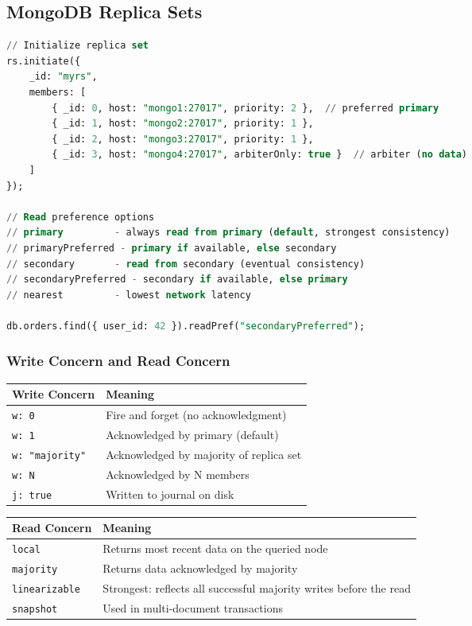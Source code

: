 \documentclass[12pt,a4paper]{article}
\begin{document}
\subsection{MongoDB Replica Sets}

\begin{lstlisting}[language=SQL, caption={MongoDB replica set}]
// Initialize replica set
rs.initiate({
    _id: "myrs",
    members: [
        { _id: 0, host: "mongo1:27017", priority: 2 },  // preferred primary
        { _id: 1, host: "mongo2:27017", priority: 1 },
        { _id: 2, host: "mongo3:27017", priority: 1 },
        { _id: 3, host: "mongo4:27017", arbiterOnly: true }  // arbiter (no data)
    ]
});

// Read preference options
// primary         - always read from primary (default, strongest consistency)
// primaryPreferred - primary if available, else secondary
// secondary       - read from secondary (eventual consistency)
// secondaryPreferred - secondary if available, else primary
// nearest         - lowest network latency

db.orders.find({ user_id: 42 }).readPref("secondaryPreferred");
\end{lstlisting}

\subsubsection{Write Concern and Read Concern}

\begin{center}
\begin{tabular}{lp{8cm}}
\toprule
\textbf{Write Concern} & \textbf{Meaning} \\
\midrule
\texttt{w: 0} & Fire and forget (no acknowledgment) \\
\texttt{w: 1} & Acknowledged by primary (default) \\
\texttt{w: "majority"} & Acknowledged by majority of replica set \\
\texttt{w: N} & Acknowledged by N members \\
\texttt{j: true} & Written to journal on disk \\
\bottomrule
\end{tabular}
\end{center}

\begin{center}
\begin{tabular}{lp{8cm}}
\toprule
\textbf{Read Concern} & \textbf{Meaning} \\
\midrule
\texttt{local} & Returns most recent data on the queried node \\
\texttt{majority} & Returns data acknowledged by majority \\
\texttt{linearizable} & Strongest: reflects all successful majority writes before the read \\
\texttt{snapshot} & Used in multi-document transactions \\
\bottomrule
\end{tabular}
\end{center}
\end{document}
